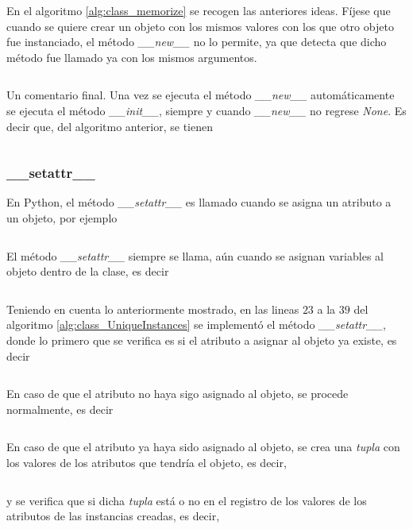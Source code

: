 \documentclass{article}
\newenvironment{code}{\captionsetup{type=listing}}{}
\begin{document}
	En el algoritmo \ref{alg:class_memorize} se recogen las anteriores ideas. Fíjese que cuando se quiere crear un objeto con los mismos valores con los que otro objeto fue instanciado, el método \emph{\_\_new\_\_} no lo permite, ya que detecta que dicho método fue llamado ya con los mismos argumentos.
	\begin{code}
		\inputminted[firstline=32, lastline=46]{python}{dumpy.py}
		\label{alg:class_memorize}
	\end{code}

	Un comentario final. Una vez se ejecuta el método \emph{\_\_new\_\_} automáticamente se ejecuta el método \emph{\_\_init\_\_}, siempre y cuando \emph{\_\_new\_\_} no regrese \emph{None}. Es decir que, del algoritmo anterior, se tienen
	\inputminted[firstline=48, lastline=48]{python}{dumpy.py}

	\subsubsection{\_\_setattr\_\_}

	En Python, el método \emph{\_\_setattr\_\_} es llamado cuando se asigna un atributo a un objeto, por ejemplo
	\inputminted[firstline=50, lastline=55]{python}{dumpy.py}

	El método \emph{\_\_setattr\_\_} siempre se llama, aún cuando se asignan variables al objeto dentro de la clase, es decir
	\inputminted[firstline=57, lastline=61]{python}{dumpy.py}

	Teniendo en cuenta lo anteriormente mostrado, en las lineas $ 23 $ a la $ 39 $ del algoritmo \ref{alg:class_UniqueInstances} se implementó el método \emph{\_\_setattr\_\_}, donde lo primero que se verifica es si el atributo a asignar al objeto ya existe, es decir
	\inputminted[firstline=24, lastline=24]{python}{collection_class.py}

	En caso de que el atributo no haya sigo asignado al objeto, se procede normalmente, es decir
	\inputminted[firstline=39, lastline=39]{python}{collection_class.py}

	En caso de que el atributo ya haya sido asignado al objeto, se crea una \emph{tupla} con los valores de los atributos que tendría el objeto, es decir,
	\inputminted[firstline=25, lastline=26, breaklines]{python}{collection_class.py}
	y se verifica que si dicha \emph{tupla} está o no en el registro de los valores de los atributos de las instancias creadas, es decir,
	\inputminted[firstline=27, lastline=27, breaklines]{python}{collection_class.py}
\end{document}
